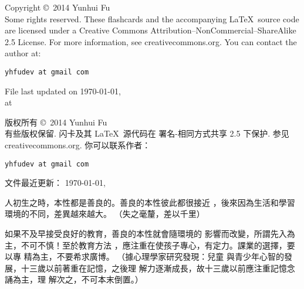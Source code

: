 \documentclass[avery5371,grid]{flashcards}
\begin{document}
\begin{flashcard}{Copyright \copyright \, 2014 Yunhui Fu\\
Some rights reserved.}
These flashcards and the accompanying \LaTeX \, source code are licensed
under a Creative Commons Attribution--NonCommercial--ShareAlike 2.5 License.  
For more information, see creativecommons.org.  You can contact the author at:
\begin{center}
\begin{small}\tt yhfudev at gmail com\end{small}

\medskip
File last updated on \today, \\
at \currenttime
\end{center}
\end{flashcard}

\begin{flashcard}[版权申明]{版权所有 \copyright \, 2014 Yunhui Fu\\
有些版权保留.}
闪卡及其 \LaTeX \, 源代码在
署名-相同方式共享 2.5 下保护.
参见 creativecommons.org.  你可以联系作者：
\begin{center}
\begin{small}\tt yhfudev at gmail com\end{small}

\medskip
文件最近更新： \today, \\
\currenttime
\end{center}
\end{flashcard}





{人初生之時，本性都是善良的。善良的本性彼此都很接近
，後來因為生活和學習環境的不同，差異越來越大。} %
{（失之毫釐，差以千里）} %

{如果不及早接受良好的教育，善良的本性就會隨環境的
影響而改變，所謂先入為主，不可不慎！至於教育方法
，應注重在使孩子專心，有定力。課業的選擇，要以專
精為主，不要希求廣博。} %
{（據心理學家研究發現：兒童
與青少年心智的發展，十三歲以前著重在記憶，之後理
解力逐漸成長，故十三歲以前應注重記憶念誦為主，理
解次之，不可本末倒置。）} %
\end{document}
